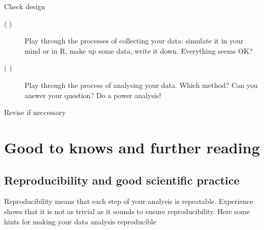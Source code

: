 \documentclass[a4paper,twoside]{tufte-book}\usepackage[]{graphicx}\usepackage[]{color}
\begin{document}
\begin{mdframed}
\begin{description}
\begin{description}
  \end{description}
  
\item[( )] Check design
  
  \begin{description}
  
  \item[( )] Play through the processes of collecting your data: simulate it in your mind or in R, make up some data, write it down. Everything seems OK?
  
  \item[( )] Play through the process of analysing your data. Which method? Can you answer your question? Do a power analysis!

  \end{description}


\item[( )] Revise if neccessary

\end{description}

\end{mdframed}


\chapter{Good to knows and further reading}

\section{Reproducibility and good scientific practice}

Reproducibility means that each step of your analysis is repeatable. Experience shows that it is not as trivial as it sounds to ensure reproducibility. Here some hints for making your data analysis reproducible
\end{document}
